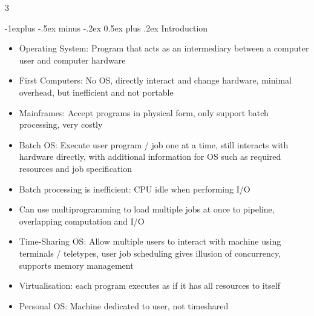 \documentclass[10pt, landscape]{article}
\makeatletter
\renewcommand{\section}{\@startsection{section}{1}{0mm}%
                                {-1ex plus -.5ex minus -.2ex}%
                                {0.5ex plus .2ex}%
                                {\normalfont\large\bfseries}}
\renewcommand{\section}{\@startsection{section}{2}{0mm}%
                                {-1explus -.5ex minus -.2ex}%
                                {0.5ex plus .2ex}%
                                {\normalfont\normalsize\bfseries}}
\makeatother
\begin{document}
\raggedright
\footnotesize
\begin{multicols*}{3}

\setlength{\columnseprule}{0.25pt}
\setlength{\premulticols}{1pt}
\setlength{\postmulticols}{1pt}
\setlength{\multicolsep}{1pt}
\setlength{\columnsep}{2pt}

\begin{center}
\end{center}

\section{Introduction}
\begin{itemize}
    \item Operating System: Program that acts as an intermediary between a computer user and computer hardware
    \item First Computers: No OS, directly interact and change hardware, minimal overhead, but inefficient and not portable
    \item Mainframes: Accept programs in physical form, only support batch processing, very costly
    \item Batch OS: Execute user program / job one at a time, still interacts with hardware directly, with additional information for OS such as required resources and job specification
    \item Batch processing is inefficient: CPU idle when performing I/O
    \item Can use multiprogramming to load multiple jobs at once to pipeline, overlapping computation and I/O
    \item Time-Sharing OS: Allow multiple users to interact with machine using terminals / teletypes, user job scheduling gives illusion of concurrency, supports memory management
    \item Virtualisation: each program executes as if it has all resources to itself
    \item Personal OS: Machine dedicated to user, not timeshared
\end{itemize}


\end{multicols*}
\end{document}

